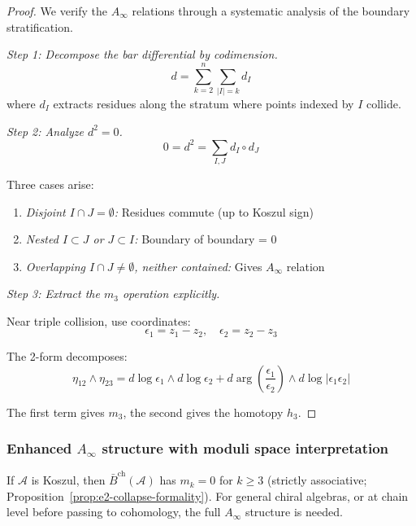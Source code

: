 \begin{proof}
We verify the $A_\infty$ relations through a systematic analysis of the boundary stratification.

\emph{Step 1: Decompose the bar differential by codimension.}
\[d = \sum_{k=2}^n \sum_{|I|=k} d_I\]
where $d_I$ extracts residues along the stratum where points indexed by $I$ collide.

\emph{Step 2: Analyze $d^2 = 0$.}
\[0 = d^2 = \sum_{I,J} d_I \circ d_J\]

Three cases arise:
\begin{enumerate}
\item \emph{Disjoint $I \cap J = \emptyset$:} Residues commute (up to Koszul sign)
\item \emph{Nested $I \subset J$ or $J \subset I$:} Boundary of boundary = 0
\item \emph{Overlapping $I \cap J \neq \emptyset$, neither contained:} Gives $A_\infty$ relation
\end{enumerate}

\emph{Step 3: Extract the $m_3$ operation explicitly.}

Near triple collision, use coordinates:
\[\epsilon_1 = z_1 - z_2, \quad \epsilon_2 = z_2 - z_3\]

The 2-form decomposes:
\[\eta_{12} \wedge \eta_{23} = d\log\epsilon_1 \wedge d\log\epsilon_2 + d\arg\left(\frac{\epsilon_1}{\epsilon_2}\right) \wedge d\log|\epsilon_1\epsilon_2|\]

The first term gives $m_3$, the second gives the homotopy $h_3$.
\end{proof}

\subsubsection{\texorpdfstring{Enhanced $A_\infty$ structure with moduli space interpretation}{Enhanced A-infinity structure with moduli space interpretation}}

\begin{remark}
If $\mathcal{A}$ is Koszul, then $\bar{B}^{\text{ch}}(\mathcal{A})$
has $m_k = 0$ for $k \geq 3$ (strictly associative;
Proposition~\ref{prop:e2-collapse-formality}).
For general chiral algebras, or at chain level before passing to cohomology, the full $A_\infty$ structure is needed.
\end{remark}


